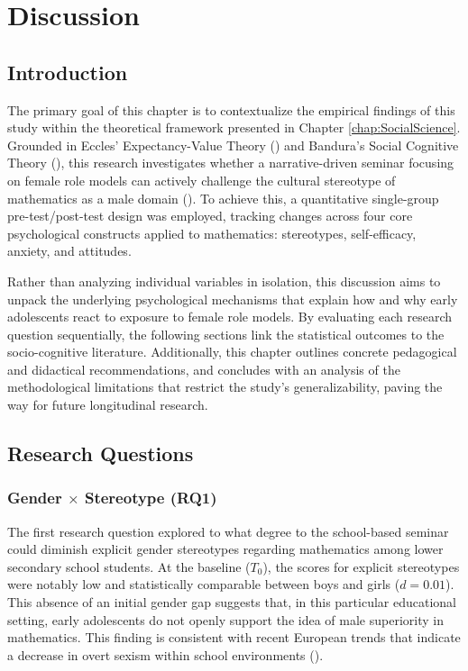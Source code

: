 \chapter{Discussion}\label{chap:discussion}
\section{Introduction}
The primary goal of this chapter is to contextualize the empirical findings of this study within the theoretical framework presented in Chapter \ref{chap:SocialScience}. Grounded in Eccles' Expectancy-Value Theory (\cite{eccles1989}) and Bandura's Social Cognitive Theory (\cite{Bandura2001}), this research investigates whether a narrative-driven seminar focusing on female role models can actively challenge the cultural stereotype of mathematics as a male domain (\cite{Cheryan2015,Nosek2002}). To achieve this, a quantitative single-group pre-test/post-test design was employed, tracking changes across four core psychological constructs applied to mathematics: stereotypes, self-efficacy, anxiety, and attitudes.

Rather than analyzing individual variables in isolation, this discussion aims to unpack the underlying psychological mechanisms that explain how and why early adolescents react to exposure to female role models. By evaluating each research question sequentially, the following sections link the statistical outcomes to the socio-cognitive literature. Additionally, this chapter outlines concrete pedagogical and didactical recommendations, and concludes with an analysis of the methodological limitations that restrict the study's generalizability, paving the way for future longitudinal research.

\section{Research Questions}
\subsection{Gender $\times$ Stereotype (RQ1)}
The first research question explored to what degree to the school-based seminar could diminish explicit gender stereotypes regarding mathematics among lower secondary school students. At the baseline ($T_0$), the scores for explicit stereotypes were notably low and statistically comparable between boys and girls ($d = 0.01$). This absence of an initial gender gap suggests that, in this particular educational setting, early adolescents do not openly support the idea of male superiority in mathematics. This finding is consistent with recent European trends that indicate a decrease in overt sexism within school environments (\cite{Master2020}).

